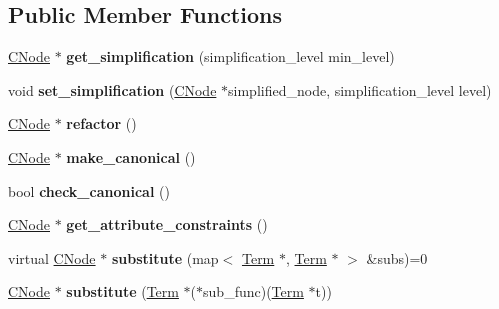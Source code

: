 \subsection*{\-Public \-Member \-Functions}
\begin{DoxyCompactItemize}
\item 
\hypertarget{classCNode_a160d72ba87c7daee766f2a4386a25e48}{\hyperlink{classCNode}{\-C\-Node} $\ast$ {\bfseries get\-\_\-simplification} (simplification\-\_\-level min\-\_\-level)}\label{classCNode_a160d72ba87c7daee766f2a4386a25e48}

\item 
\hypertarget{classCNode_abc5894d98b671e977d7659b42fd65176}{void {\bfseries set\-\_\-simplification} (\hyperlink{classCNode}{\-C\-Node} $\ast$simplified\-\_\-node, simplification\-\_\-level level)}\label{classCNode_abc5894d98b671e977d7659b42fd65176}

\item 
\hypertarget{classCNode_ae815e6683207015e30dcd66104e02434}{\hyperlink{classCNode}{\-C\-Node} $\ast$ {\bfseries refactor} ()}\label{classCNode_ae815e6683207015e30dcd66104e02434}

\item 
\hypertarget{classCNode_a890c35e430066c0c1e88e9918f9cafca}{\hyperlink{classCNode}{\-C\-Node} $\ast$ {\bfseries make\-\_\-canonical} ()}\label{classCNode_a890c35e430066c0c1e88e9918f9cafca}

\item 
\hypertarget{classCNode_a7765b18fe194fb0fb07e9bdf98d70889}{bool {\bfseries check\-\_\-canonical} ()}\label{classCNode_a7765b18fe194fb0fb07e9bdf98d70889}

\item 
\hypertarget{classCNode_a5e5ce9b83eea3a92484e1ba930067580}{\hyperlink{classCNode}{\-C\-Node} $\ast$ {\bfseries get\-\_\-attribute\-\_\-constraints} ()}\label{classCNode_a5e5ce9b83eea3a92484e1ba930067580}

\item 
\hypertarget{classCNode_a2a8156e96d3621d58bfe43cc91d7aa8a}{virtual \hyperlink{classCNode}{\-C\-Node} $\ast$ {\bfseries substitute} (map$<$ \hyperlink{classTerm}{\-Term} $\ast$, \hyperlink{classTerm}{\-Term} $\ast$ $>$ \&subs)=0}\label{classCNode_a2a8156e96d3621d58bfe43cc91d7aa8a}

\item 
\hypertarget{classCNode_aaca668f2d986e480599bd69adeeeea39}{\hyperlink{classCNode}{\-C\-Node} $\ast$ {\bfseries substitute} (\hyperlink{classTerm}{\-Term} $\ast$($\ast$sub\-\_\-func)(\hyperlink{classTerm}{\-Term} $\ast$t))}\label{classCNode_aaca668f2d986e480599bd69adeeeea39}


\end{DoxyCompactItemize}
